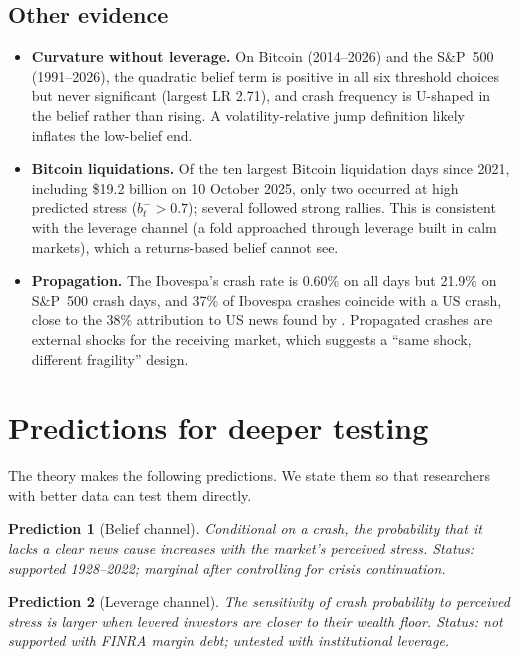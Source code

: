 \documentclass[11pt,a4paper]{article}
\newtheorem{prediction}{Prediction}
\theoremstyle{remark}
\begin{document}
\subsection{Other evidence}

\begin{itemize}[leftmargin=*]
\item \textbf{Curvature without leverage.} On Bitcoin (2014--2026) and the S\&P~500
(1991--2026), the quadratic belief term is positive in all six threshold choices but never
significant (largest LR 2.71), and crash frequency is U-shaped in the belief rather than
rising. A volatility-relative jump definition likely inflates the low-belief end.
\item \textbf{Bitcoin liquidations.} Of the ten largest Bitcoin liquidation days since 2021,
including \$19.2 billion on 10 October 2025, only two occurred at high predicted stress
($b^-_t>0.7$); several followed strong rallies. This is consistent with the leverage channel
(a fold approached through leverage built in calm markets), which a returns-based belief
cannot see.
\item \textbf{Propagation.} The Ibovespa's crash rate is 0.60\% on all days but 21.9\% on
S\&P~500 crash days, and 37\% of Ibovespa crashes coincide with a US crash, close to the
38\% attribution to US news found by \citet{BBDS2021}. Propagated crashes are external shocks
for the receiving market, which suggests a ``same shock, different fragility'' design.
\end{itemize}

\section{Predictions for deeper testing}\label{sec:future}

The theory makes the following predictions. We state them so that researchers with better
data can test them directly.

\begin{prediction}[Belief channel]\label{pred:belief}
Conditional on a crash, the probability that it lacks a clear news cause increases with the
market's perceived stress. \emph{Status:} supported 1928--2022; marginal after controlling
for crisis continuation.
\end{prediction}

\begin{prediction}[Leverage channel]
The sensitivity of crash probability to perceived stress is larger when levered investors are
closer to their wealth floor. \emph{Status:} not supported with FINRA margin debt; untested
with institutional leverage.
\end{prediction}
\end{document}
